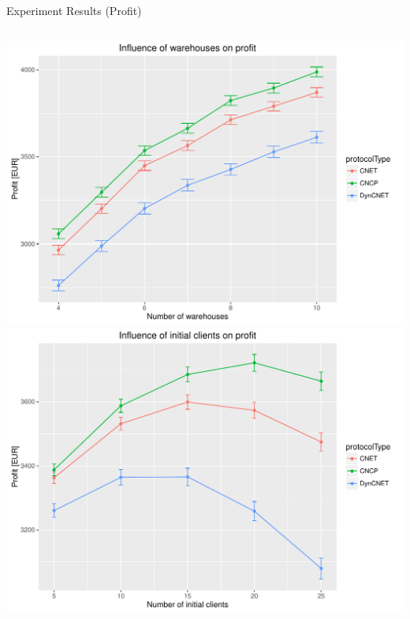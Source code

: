 \documentclass[notes]{beamer}
\begin{document}
	\begin{frame}{Experiment Results (Profit)}
		\begin{columns}	
			\begin{center}	
				\includegraphics[height=0.4\textheight]{warehouses-profit}\\
				\includegraphics[height=0.4\textheight]{initialclients-profit}
			\end{center}
		

\end{columns}
\end{frame}
\end{document}
